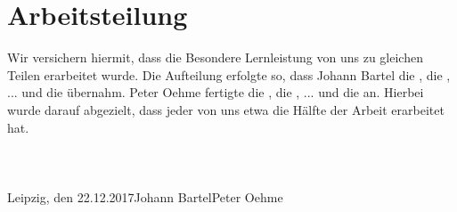 \chapter{Arbeitsteilung}
Wir versichern hiermit, dass die Besondere Lernleistung von uns zu gleichen Teilen erarbeitet wurde.
Die Aufteilung erfolgte so, dass Johann Bartel die , die , ... und die  übernahm.
Peter Oehme fertigte die , die , ... und die  an.
Hierbei wurde darauf abgezielt, dass jeder von uns etwa die Hälfte der Arbeit erarbeitet hat. \\\\\\\\
Leipzig, den 22.12.2017\tab Johann Bartel\tab \tab Peter Oehme